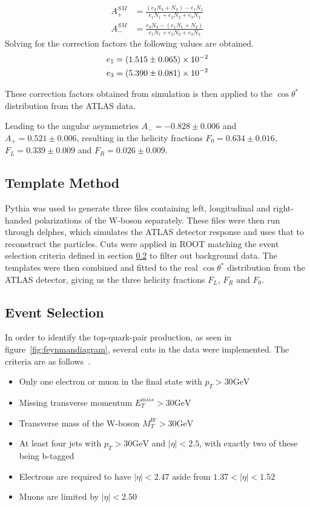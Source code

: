 \documentclass[12pt,a4paper]{article}
\numberwithin{equation}{section}
\begin{document}
\begin{align}
	A_{+}^{SM} &= \frac{(e_3N_3 + N_2) - e_1N_1}{e_1N_1 + e_2N_2 + e_3N_3} \\
	A_{-}^{SM} &= \frac{e_3N_3 - (e_1N_1 + N_2)}{e_1N_1 + e_2N_2 + e_3N_3}     
\end{align}
Solving for the correction factors the following values are obtained. 
\begin{align}
	e_1 &=  \num{1.515 +- 0.065E-2} \\ e_3 &= \num{5.390 +- 0.081E-2}
\end{align}

These correction factors obtained from simulation is then applied to the $\cos\theta^{*}$ distribution from the ATLAS data. 

Leading to the angular asymmetries $A_- = -0.828 \pm 0.006$ and $A_+ = 0.521 \pm 0.006$, 
resulting in the helicity fractions $F_0=0.634 \pm 0.016$,
$F_L=0.339 \pm 0.009$ and $F_R=0.026 \pm 0.009$. 

\subsection{Template Method}
Pythia was used to generate three files containing left, longitudinal and right-handed polarizations of the W-boson separately. These files were then run through delphes, which simulates the ATLAS detector response and uses that to reconstruct the particles. Cuts were applied in ROOT matching the event selection criteria defined in section \ref{sec:cuts} to filter out background data. The templates were then combined and fitted to the real $\cos \theta^{*}$ distribution from the ATLAS detector, giving us the three helicity fractions $F_L$, $F_R$ and $F_0$.

\subsection{Event Selection}\label{sec:cuts}
In order to identify the top-quark-pair production, as seen in
figure~\ref{fig:feynmandiagram}, several cuts in the data were implemented. The
criteria are as follows~\cite{oreach2020}.
\begin{itemize}
	\item Only one electron or muon in the final state with $p_{T} > 30 \mathrm{GeV}$
	\item Missing transverse momentum $E_{T}^{miss} > 30 \mathrm{GeV}$
	\item Transverse mass of the W-boson $M_{T}^{W} > 30 \mathrm{GeV}$
	\item At least four jets with $p_{T} > 30 \mathrm{GeV}$ and $|\eta| < 2.5$, with exactly two of these being b-tagged
	\item Electrons are required to have $|\eta| < 2.47$ aside from $1.37 < |\eta| < 1.52$
	\item Muons are limited by $|\eta| < 2.50$
\end{itemize}
\end{document}
